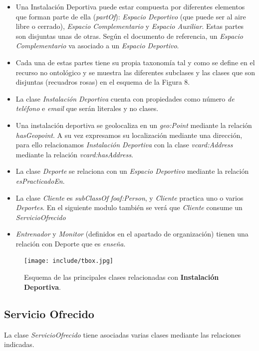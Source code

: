\documentclass[a4paper,12pt]{article}
\begin{document}
	\begin{itemize}
		\item Una Instalación Deportiva puede estar compuesta por diferentes elementos que forman parte de ella (\textit{partOf}): \textit{Espacio Deportivo} (que puede ser al aire libre o cerrado), \textit{Espacio Complementario} y \textit{Espacio Auxiliar}. Estas partes son disjuntas unas de otras. Según el documento de referencia, un \textit{Espacio Complementario} va asociado a un \textit{Espacio Deportivo}.
		\item Cada una de estas partes tiene su propia taxonomía tal y como se define en el recurso no ontológico y se muestra las diferentes subclases y las clases que son disjuntas (recuadros rosas) en el esquema de la Figura 8.
		\item La clase \textit{Instalación Deportiva} cuenta con propiedades como número\textit{ de teléfono} e \textit{email} que serán literales y no clases.
		\item Una instalación deportiva se geolocaliza en un \textit{geo:Point} mediante la relación \textit{hasGeopoint}. A su vez expresamos su localización mediante una dirección, para ello relacionamos \textit{Instalación Deportiva} con la clase \textit{vcard:Address} mediante la relación \textit{vcard:hasAddress}.
		\item La clase \textit{Deporte} se relaciona con un \textit{Espacio Deportivo} mediante la relación \textit{esPracticadoEn}.
		\item La clase \textit{Cliente} es \textit{subClassOf} \textit{foaf:Person}, y \textit{Cliente} practica uno o varios \textit{Deportes}. En el siguiente modulo también se verá que \textit{Cliente} consume un \textit{ServicioOfrecido}
		\item \textit{Entrenador} y \textit{Monitor} (definidos en el apartado de organización) tienen una relación con Deporte que es \textit{enseña}.
	\end{itemize}

	\begin{figure}[H]
		\centering
		\texttt{[image: include/tbox.jpg]}
		\caption{Esquema de las principales clases relacionadas con \textbf{Instalación Deportiva}.}
	\end{figure}
		
	\subsection{Servicio Ofrecido}
	
	La clase \textit{ServicioOfrecido} tiene asociadas varias clases mediante las relaciones indicadas.
	
\end{document}
